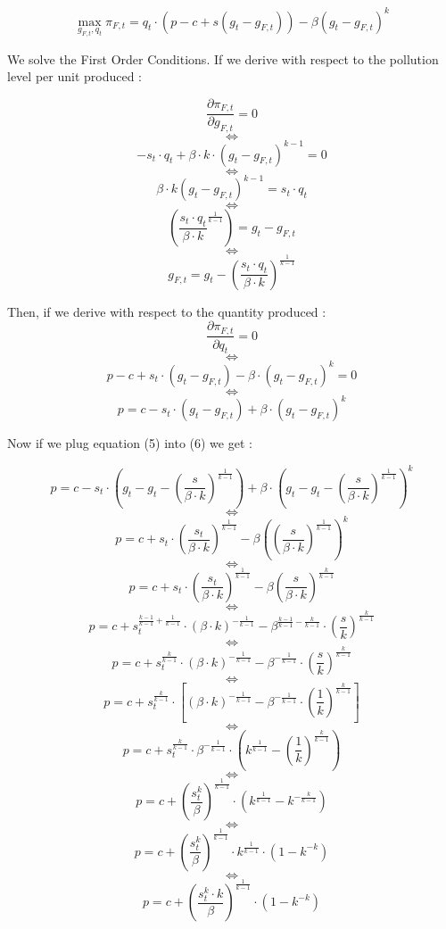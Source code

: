 \documentclass{article}
\begin{document}
$$
    \max_{g_{F,t},q_{t}}{\pi_{F,t}=q_{t}\cdot\left(p-c+s(g_{t}-g_{F,t})\right)-\beta(g_{t}-g_{F,t})^{k}}
$$

We solve the First Order Conditions. If we derive with respect to the pollution level per unit produced : 

$$\frac{\partial \pi_{F,t}}{\partial g_{F,t}}=0$$
$$\iff$$
$$-s_{t}\cdot q_t+\beta\cdot k\cdot(g_{t}-g_{F,t})^{k-1}=0$$
$$\iff$$
$$\beta\cdot k(g_{t}-g_{F,t})^{k-1}=s_{t}\cdot q_{t}$$
$$\iff$$
$$\left(\frac{s_{t}\cdot q_{t}}{\beta\cdot k}^{\frac{1}{k-1}}\right)=g_{t}-g_{F,t}$$
$$\iff$$
\begin{equation}
    g_{F,t}=g_{t}-\left(\frac{s_{t}\cdot q_{t}}{\beta\cdot k}\right)^{\frac{1}{k-1}}
\end{equation}

Then, if we derive with respect to the quantity produced :
$$\frac{\partial \pi_{F,t}}{\partial q_{t}}=0$$
$$\iff$$
$$p-c+s_{t}\cdot(g_{t}-g_{F,t})-\beta\cdot(g_{t}-g_{F,t})^{k}=0$$
$$\iff$$
\begin{equation}
    p=c-s_{t}\cdot(g_{t}-g_{F,t})+\beta\cdot(g_{t}-g_{F,t})^{k} 
\end{equation}

Now if we plug equation (5) into (6) we get : 

$$ p=c-s_{t}\cdot\left(g_{t}-g_{t}-\left(\frac{s}{\beta\cdot k}\right)^{\frac{1}{k-1}}\right)+\beta\cdot\left(g_{t}-g_{t}-\left(\frac{s}{\beta\cdot k}\right)^{\frac{1}{k-1}}\right)^{k}$$
$$\iff$$
$$p=c+s_{t}\cdot\left(\frac{s_{t}}{\beta\cdot k}\right)^{\frac{1}{k-1}}-\beta\left(\left(\frac{s}{\beta\cdot k}\right)^{\frac{1}{k-1}}\right)^{k}$$
$$\iff$$
$$p=c+s_{t}\cdot\left(\frac{s_{t}}{\beta\cdot k}\right)^{\frac{1}{k-1}}-\beta\left(\frac{s}{\beta\cdot k}\right)^{\frac{k}{k-1}}$$
$$\iff$$
$$p=c+s_{t}^{\frac{k-1}{k-1}+\frac{1}{k-1}}\cdot\left({\beta\cdot k}\right)^{-\frac{1}{k-1}}-\beta^{\frac{k-1}{k-1}-\frac{k}{k-1}}\cdot\left(\frac{s}{k}\right)^{\frac{k}{k-1}}$$
$$\iff$$
$$p=c+s_{t}^{\frac{k}{k-1}}\cdot\left({\beta\cdot k}\right)^{-\frac{1}{k-1}}-\beta^{-\frac{1}{k-1}}\cdot\left(\frac{s}{k}\right)^{\frac{k}{k-1}}$$
$$\iff$$
$$p=c+s_{t}^{\frac{k}{k-1}}\cdot\left[\left({\beta\cdot k}\right)^{-\frac{1}{k-1}}-\beta^{-\frac{1}{k-1}}\cdot\left(\frac{1}{k}\right)^{\frac{k}{k-1}}\right]$$
$$\iff$$
$$p=c+s_{t}^{\frac{k}{k-1}}\cdot{\beta}^{-\frac{1}{k-1}}\cdot\left(k^{\frac{1}{k-1}}-\left(\frac{1}{k}\right)^{\frac{k}{k-1}}\right)$$
$$\iff$$
$$p=c+\left(\frac{s_{t}^k}{\beta}\right)^{\frac{1}{k-1}}\cdot\left(k^{\frac{1}{k-1}}-{k}^{-\frac{k}{k-1}}\right)$$
$$\iff$$
$$p=c+\left(\frac{s_{t}^k}{\beta}\right)^{\frac{1}{k-1}}\cdot{k}^{\frac{1}{k-1}}\cdot\left(1-{k}^{-k}\right)$$
$$\iff$$
\begin{equation}
    p=c+\left(\frac{s_{t}^k\cdot k}{\beta}\right)^{\frac{1}{k-1}}\cdot\left(1-{k}^{-k}\right)
\end{equation}
\end{document}
